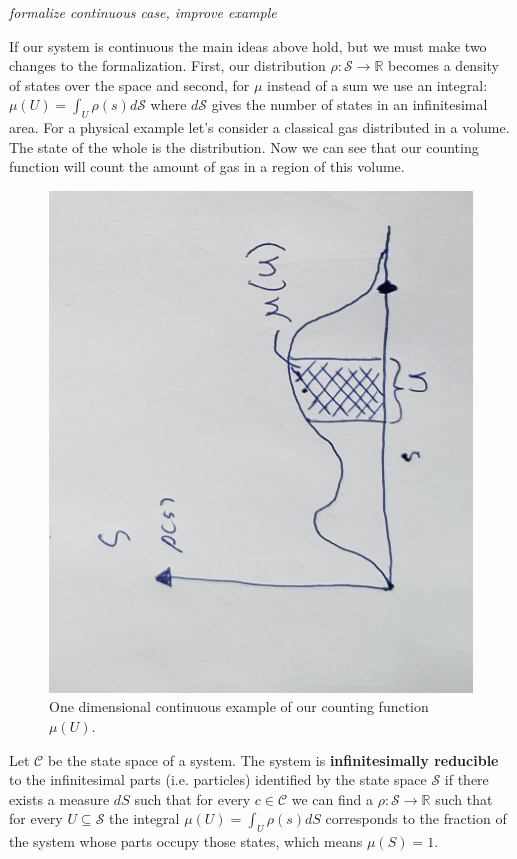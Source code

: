 \documentclass{article}
\begin{document}
	\emph{formalize continuous case, improve example}	
	
	If our system is continuous the main ideas above hold, but we must make two changes to the formalization. First, our distribution $\rho : \mathcal{S} \to \mathbb{R}$ becomes a density of states over the space and second, for $\mu$ instead of a sum we use an integral: $\mu(U) = \int_{U} \rho(s) d\mathcal{S}$ where $d\mathcal{S}$ gives the number of states in an infinitesimal area. For a physical example let's consider a classical gas distributed in a volume. The state of the whole is the distribution. Now we can see that our counting function will count the amount of gas in a region of this volume.
\begin{figure}[!ht]
\centerline{\includegraphics[width=\textwidth,angle=-90,scale=.45]{diagram4.jpg}}
\caption{One dimensional continuous example of our counting function $\mu(U)$.}
\end{figure}
	
\begin{defn}
	Let $\mathcal{C}$ be the state space of a system. The system is \textbf{infinitesimally reducible} to the infinitesimal parts (i.e. particles) identified by the state space $\mathcal{S}$ if there exists a measure $dS$ such that for every $c \in \mathcal{C}$ we can find a $\rho : \mathcal{S} \to \mathbb{R}$ such that for every $U \subseteq \mathcal{S}$ the integral $\mu(U) = \int_U \rho(s) dS$ corresponds to the fraction of the system whose parts occupy those states, which means $\mu(S) = 1$.
\end{defn}	
	
\end{document}
